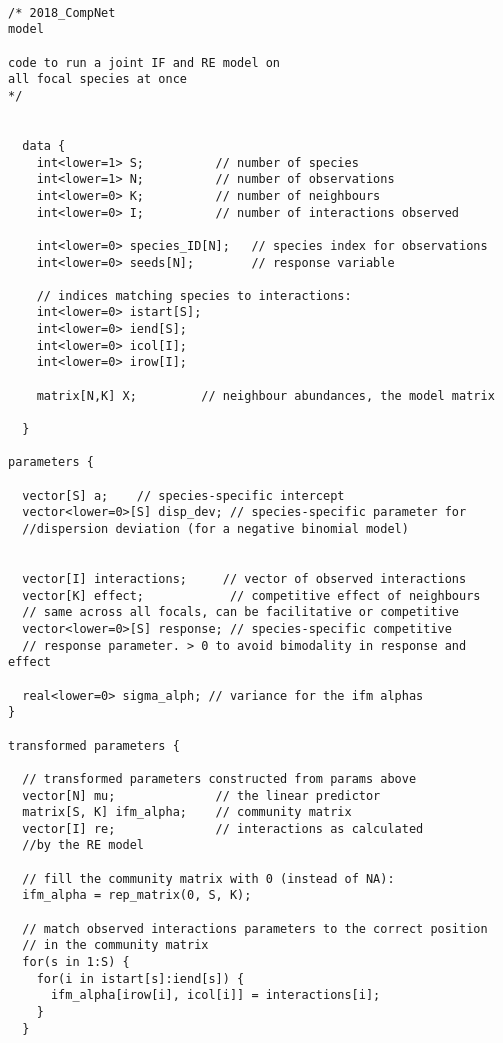 \documentclass[a4,12pt]{article}
\begin{document}
        \begin{lstlisting}

/* 2018_CompNet
model

code to run a joint IF and RE model on 
all focal species at once
*/ 
  
  
  data {
    int<lower=1> S;          // number of species 
    int<lower=1> N;          // number of observations
    int<lower=0> K;          // number of neighbours 
    int<lower=0> I;          // number of interactions observed
    
    int<lower=0> species_ID[N];   // species index for observations
    int<lower=0> seeds[N];        // response variable 
    
    // indices matching species to interactions:
    int<lower=0> istart[S];  
    int<lower=0> iend[S];
    int<lower=0> icol[I];
    int<lower=0> irow[I];
    
    matrix[N,K] X;         // neighbour abundances, the model matrix
  
  } 

parameters {
  
  vector[S] a;    // species-specific intercept
  vector<lower=0>[S] disp_dev; // species-specific parameter for 
  //dispersion deviation (for a negative binomial model)
  
  
  vector[I] interactions;     // vector of observed interactions
  vector[K] effect;            // competitive effect of neighbours
  // same across all focals, can be facilitative or competitive
  vector<lower=0>[S] response; // species-specific competitive 
  // response parameter. > 0 to avoid bimodality in response and effect  

  real<lower=0> sigma_alph; // variance for the ifm alphas
} 

transformed parameters {
  
  // transformed parameters constructed from params above
  vector[N] mu;              // the linear predictor
  matrix[S, K] ifm_alpha;    // community matrix 
  vector[I] re;              // interactions as calculated 
  //by the RE model
  
  // fill the community matrix with 0 (instead of NA):
  ifm_alpha = rep_matrix(0, S, K);   
  
  // match observed interactions parameters to the correct position 
  // in the community matrix
  for(s in 1:S) {
    for(i in istart[s]:iend[s]) {
      ifm_alpha[irow[i], icol[i]] = interactions[i];
    }
  }
  

\end{lstlisting}
\end{document}
